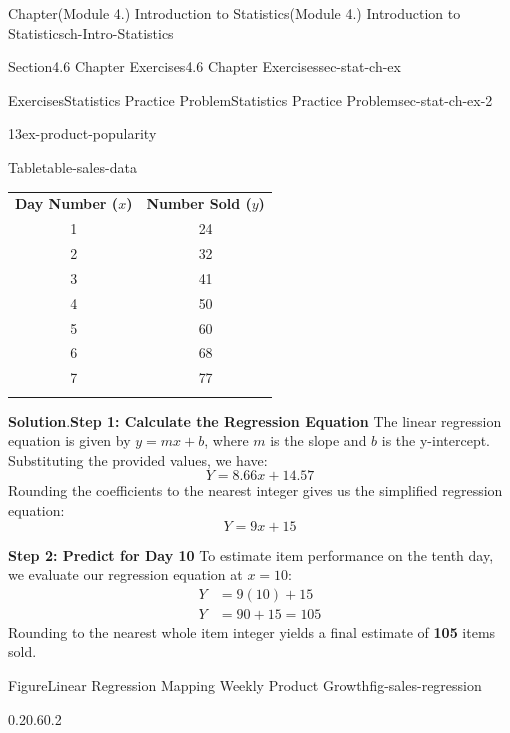 \documentclass[oneside,10pt,]{book}
\newcommand{\blocktitlefont}{\relax}
\newcommand{\terminology}[1]{\textbf{#1}}
\newcommand{\hrulethin}  {\noalign{\hrule height 0.04em}}
\newcommand{\amp}{&}
\begin{document}
\begin{chapterptx}{Chapter}{(Module 4.) Introduction to Statistics}{}{(Module 4.) Introduction to Statistics}{}{}{ch-Intro-Statistics}
\begin{sectionptx}{Section}{4.6 Chapter Exercises}{}{4.6 Chapter Exercises}{}{}{sec-stat-ch-ex}
\begin{exercises-subsection-numberless}{Exercises}{Statistics Practice Problem}{}{Statistics Practice Problem}{}{}{sec-stat-ch-ex-2}
\begin{divisionexercise}{13}{}{}{ex-product-popularity}
\begin{tableptx}{Table}{\textbf{}}{table-sales-data}{}
{\begin{tabular}{cc}
{\bfseries{}\terminology{Day Number (\(x\))}}&{\bfseries{}\terminology{Number Sold (\(y\))}}\tabularnewline\hrulethin
1&24\tabularnewline\hrulethin
2&32\tabularnewline\hrulethin
3&41\tabularnewline\hrulethin
4&50\tabularnewline\hrulethin
5&60\tabularnewline\hrulethin
6&68\tabularnewline\hrulethin
7&77\tabularnewline\hrulethin
\end{tabular}
}%
\end{tableptx}%
\par\smallskip%
\noindent\textbf{\blocktitlefont Solution}.\hypertarget{ex-product-popularity-2}{}\quad{}\terminology{Step 1: Calculate the Regression Equation} The linear regression equation is given by \(y = mx + b\), where \(m\) is the slope and \(b\) is the y-intercept. Substituting the provided values, we have:%
\begin{equation*}
Y = 8.66x + 14.57
\end{equation*}
Rounding the coefficients to the nearest integer gives us the simplified regression equation:%
\begin{equation*}
Y = 9x + 15
\end{equation*}
%
\par
\terminology{Step 2: Predict for Day 10} To estimate item performance on the tenth day, we evaluate our regression equation at \(x = 10\):%
\begin{align*}
Y \amp = 9(10) + 15\\
Y \amp = 90 + 15 = 105
\end{align*}
Rounding to the nearest whole item integer yields a final estimate of \terminology{105} items sold.%
\begin{figureptx}{Figure}{Linear Regression Mapping Weekly Product Growth}{fig-sales-regression}{}%
\begin{image}{0.2}{0.6}{0.2}{}%
%
\end{image}%
\tcblower
\end{figureptx}%
\end{divisionexercise}%
\end{exercises-subsection-numberless}
\end{sectionptx}
\end{chapterptx}
\end{document}
